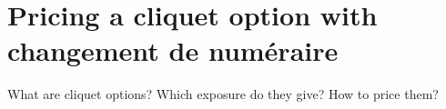 \section{Pricing a cliquet option with changement de num\'eraire}

\begin{tcolorbox}[width=\linewidth, sharp corners=all, colback=white!95!black]
What are cliquet options? Which exposure do they give? How to price them?
\end{tcolorbox}

